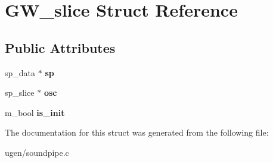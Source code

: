 \hypertarget{structGW__slice}{}\section{G\+W\+\_\+slice Struct Reference}
\label{structGW__slice}
\subsection*{Public Attributes}
\begin{DoxyCompactItemize}
\item 
\hypertarget{structGW__slice_a7476c72c4db831ba65ec6943a307c0ef}{}\label{structGW__slice_a7476c72c4db831ba65ec6943a307c0ef} 
sp\+\_\+data $\ast$ {\bfseries sp}
\item 
\hypertarget{structGW__slice_aafc11534b624ea30f4f56279fe59357d}{}\label{structGW__slice_aafc11534b624ea30f4f56279fe59357d} 
sp\+\_\+slice $\ast$ {\bfseries osc}
\item 
\hypertarget{structGW__slice_add4be3250798160ee5cfebb2e3a5fcca}{}\label{structGW__slice_add4be3250798160ee5cfebb2e3a5fcca} 
m\+\_\+bool {\bfseries is\+\_\+init}
\end{DoxyCompactItemize}


The documentation for this struct was generated from the following file\+:\begin{DoxyCompactItemize}
\item 
ugen/soundpipe.\+c\end{DoxyCompactItemize}

